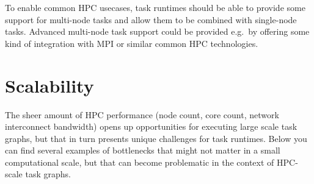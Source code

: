To enable common HPC usecases, task runtimes should be able to provide some support for multi-node
tasks and allow them to be combined with single-node tasks. Advanced multi-node task support could
be provided e.g.\ by offering some kind of integration with MPI or similar common HPC technologies.

\section{Scalability}
The sheer amount of HPC performance (node count, core count, network interconnect bandwidth) opens
up opportunities for executing large scale task graphs, but that in turn presents unique challenges
for task runtimes. Below you can find several examples of bottlenecks that might not matter in a
small computational scale, but that can become problematic in the context of HPC-scale task graphs.

